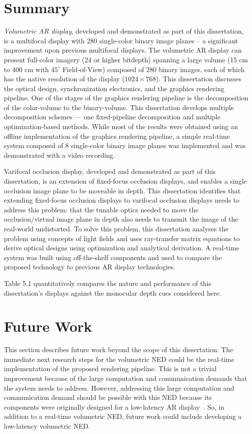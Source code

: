 \section{Summary}


\emph{Volumetric AR display}, developed and demonstrated as part of this dissertation, is a multifocal display with 280 single-color binary image planes – a significant improvement upon previous multifocal displays. The volumetric AR display can present full-color imagery (24 or higher bitdepth) spanning a large volume (15 cm to 400 cm with $45^\circ$ Field-of-View) composed of 280 binary images, each of which has the native resolution of the display ($1024 \times 768$). This dissertation discusses the optical design, synchronization electronics, and the graphics rendering pipeline. One of the stages of the graphics rendering pipeline is the decomposition of the color-volume to the binary-volume. This dissertation develops multiple decomposition schemes --- one fixed-pipeline decomposition and multiple optimization-based methods. While most of the results were obtained using an offline implementation of the graphics rendering pipeline, a simple real-time system composed of 8 single-color binary image planes was implemented and was demonstrated with a video recording. 

Varifocal occlusion display, developed and demonstrated as part of this dissertation, is an extension of fixed-focus occlusion displays, and enables a single occlusion image plane to be moveable in depth. This dissertation identifies that extending fixed-focus occlusion displays to varifocal occlusion displays needs to address this problem: that the tunable optics needed to move the occlusion/virtual image plane in depth also needs to transmit the image of the real-world undistorted. To solve this problem, this dissertation analyses the problem using concepts of light fields and uses ray-transfer matrix equations to derive optical designs using optimization and analytical derivation. A real-time system was built using off-the-shelf components and used to compare the proposed technology to previous AR display technologies.

Table 5.1 quantitatively compares the nature and performance of this dissertation’s displays against the monocular depth cues considered here. 

\section{Future Work}
This section describes future work beyond the scope of this dissertation. 
The immediate next research steps for the volumetric NED could be the real-time implementation of the proposed rendering pipeline. 
This is not a trivial improvement because of the large computation and communication demands that the system needs to address. 
However, addressing this large computation and communication demand should be possible with this NED because its components were originally designed for a low-latency AR display~\cite{Lincoln2016motion}. 
So, in addition to a real-time volumetric NED, future work could include developing a low-latency volumetric NED. 

